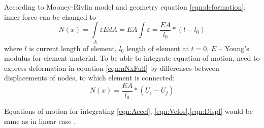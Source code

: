\documentclass[12pt]{report}
\begin{document}
According to Mooney-Rivlin model and geometry equation \eqref{eqn:deformation}, inner force can be changed to
\begin{equation}\label{eqn:nNxFull}
  N(x)= \int\limits_A \varepsilon EdA=EA\int \varepsilon=\frac{EA}{l_0}*(l-l_0)
\end{equation}
where $l$ is current length of element, $l_0$ length of element at $t=0$, $E$ – Young’s modulus for element material.
To be able to integrate equation of motion, need to express deformation in equation \eqref{eqn:nNxFull} by differenses 
between displacements of nodes, to which element is connected:
\begin{equation}\label{eqn:nNxWdispl}
  N(x)=\frac{EA}{l_0}*(U_{i}-U_{j})
\end{equation}\par
Equations of motion for integrating \eqref{eqn:Accel}, \eqref{eqn:Velos},\eqref{eqn:Displ} would be same as in linear case \textcite{Picault2014}.
\par
\newpage
\printbibliography[title=List of literature]
\end{document}
